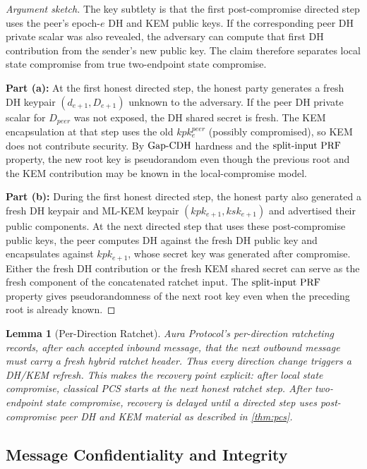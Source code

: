 \documentclass[preprint,12pt]{elsarticle}
\newtheorem{lemma}[theorem]{Lemma}
\theoremstyle{definition}
\newcommand{\tech}[1]{\textnormal{#1}}
\newcommand{\GapCDH}{\tech{Gap-CDH}}
\newcommand{\splitInputPRF}{\tech{split-input PRF}}
\begin{document}
\begin{proof}[Argument sketch]\renewcommand{\qedsymbol}{}
The key subtlety is that the first post-compromise directed step uses the
peer's epoch-$e$ DH and KEM public keys. If the corresponding peer DH private
scalar was also revealed, the adversary can compute that first DH contribution
from the sender's new public key. The claim therefore separates local
state compromise from true two-endpoint state compromise.

\textbf{Part (a):} At the first honest directed step, the honest party generates a fresh DH keypair $(d_{e+1}, D_{e+1})$ unknown to the adversary. If the peer DH private scalar for $D_{\mathit{peer}}$ was not exposed, the DH shared secret is fresh. The KEM encapsulation at that step uses the old $kpk_e^{\mathit{peer}}$ (possibly compromised), so KEM does not contribute security. By $\GapCDH$ hardness and the $\splitInputPRF$ property, the new root key is pseudorandom even though the previous root and the KEM contribution may be known in the local-compromise model.

\textbf{Part (b):} During the first honest directed step, the honest party also
generated a fresh DH keypair and ML-KEM keypair $(kpk_{e+1}, ksk_{e+1})$ and
advertised their public components. At the next directed step that uses these
post-compromise public keys, the peer computes DH against the fresh DH public
key and encapsulates against $kpk_{e+1}$, whose secret key was generated after
compromise. Either the fresh DH contribution or the fresh KEM shared secret can
serve as the fresh component of the concatenated ratchet input. The
$\splitInputPRF$ property gives pseudorandomness of the next root key even when
the preceding root is already known.
\end{proof}

\begin{lemma}[Per-Direction Ratchet]\label{lem:per-direction}
Aura Protocol's per-direction ratcheting records, after each accepted inbound message,
that the next outbound message must carry a fresh hybrid ratchet header. Thus
every direction change triggers a DH/KEM refresh. This makes the recovery point
explicit: after local state compromise, classical PCS starts at the next honest
ratchet step. After two-endpoint state compromise, recovery is delayed until a
directed step uses post-compromise peer DH and KEM material as described in
\cref{thm:pcs}.
\end{lemma}

\subsection{Message Confidentiality and Integrity}
\end{document}
